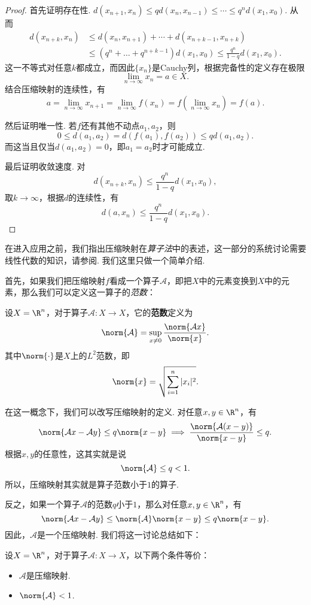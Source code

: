 \begin{proof}
首先证明存在性. $d(x_{n+1},x_n)\leq qd(x_n,x_{n-1})\leq \cdots\leq q^nd(x_1,x_0).$
从而
\begin{align*}
d(x_{n+k},x_n)&\leq d(x_n,x_{n+1})+\cdots+d(x_{n+k-1},x_{n+k})\\
&\leq(q^n+\dots+q^{n+k-1})d(x_1,x_0)\leq \frac{q^{n}}{1-q}d(x_1,x_0).
\end{align*}
这一不等式对任意$k$都成立，而因此$\{x_n\}$是Cauchy列，根据完备性的定义存在极限
\[\lim_{n\to\infty} x_n=a\in X.\]
结合压缩映射的连续性，有
\[a=\lim_{n\to\infty}x_{n+1} = \lim_{n\to\infty}f(x_n)=f\left(\lim_{n\to\infty}x_n\right)=f(a).\]

然后证明唯一性. 若$f$还有其他不动点$a_1,a_2$，则
\[0\leq d(a_1,a_2)=d(f(a_1),f(a_2))\leq qd(a_1,a_2).\]
而这当且仅当$d(a_1,a_2)=0$，即$a_1=a_2$时才可能成立.

最后证明收敛速度. 对
\[d(x_{n+k},x_n)\leq \frac{q^n}{1-q}d(x_1,x_0),\]
取$k\to\infty$，根据$d$的连续性，有
\[d(a,x_n)\leq \frac{q^n}{1-q}d(x_1,x_0).\]
\end{proof}

在进入应用之前，我们指出压缩映射在\emph{算子法}中的表述，这一部分的系统讨论需要线性代数的知识，请参阅. 我们这里只做一个简单介绍. 

首先，如果我们把压缩映射$f$看成一个算子$\mathcal A$，即把$X$中的元素变换到$X$中的元素，那么我们可以定义这一算子的\emph{范数}：

\begin{definition}[算子范数]
    设$X=\R^n$，对于算子$\mathcal A:X\to X$，它的\textbf{范数}定义为
    \[\norm{\mathcal A}=\sup_{x\neq 0}\frac{\norm{\mathcal A x}}{\norm{x}}.\]
    其中$\norm{\cdot}$是$X$上的$L^2$范数，即
    \[\norm{x}=\sqrt{\sum_{i=1}^n|x_i|^2}.\]
\end{definition}

在这一概念下，我们可以改写压缩映射的定义. 对任意$x,y\in \R^n$，有
\[\norm{\mathcal A x-\mathcal A y}\leq q\norm{x-y}\implies \frac{\norm{\mathcal A(x-y)}}{\norm{x-y}}\leq q.\]
根据$x,y$的任意性，这其实就是说
\[\norm{\mathcal A}\leq q<1.\]
所以，压缩映射其实就是算子范数小于$1$的算子. 

反之，如果一个算子$\mathcal A$的范数$q$小于$1$，那么对任意$x,y\in \R^n$，有
\[\norm{\mathcal A x-\mathcal A y}\leq \norm{\mathcal A}\norm{x-y}\leq q\norm{x-y}.\]
因此，$\mathcal A$是一个压缩映射. 我们将这一讨论总结如下：

\begin{theorem}\label{thm:operator-fixed-point}
    设$X=\R^n$，对于算子$\mathcal A:X\to X$，以下两个条件等价：
    \begin{itemize}
        \item $\mathcal A$是压缩映射.
        \item $\norm{\mathcal A}<1$.
    \end{itemize}
\end{theorem}

